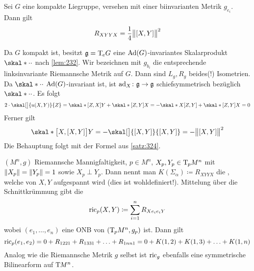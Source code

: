 \begin{korollar}[{name=[Krümmungstensor einer kompakten Liegruppe]}]
	Sei $G$ eine kompakte Liegruppe, versehen mit einer biinvarianten Metrik $g_{e_i}$.
	Dann gilt
	\[
		R_{XYYX} = \frac{1}{4} \norm[\big]{\benbrace*{X,Y}}^2 
	\]
\end{korollar}
\begin{beweis}
	Da $G$ kompakt ist, besitzt $\mathfrak{g} = \Tmap_e G$ eine $\Ad(G)$-invariantes Skalarprodukt $\skal*{\cdot }{\cdot }$ nach \autoref{lem:232}.
	Wir bezeichnen mit $g_{b_i}$ die entsprechende linksinvariante Riemannsche Metrik auf $G$.
	Dann sind $L_g,R_g$ beides(!) Isometrien.
	Da $\skal*{\cdot}{\cdot }$ $\Ad(G)$-invariant ist, ist $\ad_X \colon \mathfrak{g} \to \mathfrak{g}$ schiefsymmetrisch bezüglich $\skal*{\cdot}{\cdot}$.
	Es folgt 
	\[
		2 \cdot \skal[\big]{u(X,Y)}{Z} = \skal*{ \benbrace*{Z,X}}{Y} + \skal*{\benbrace*{Z,Y}}{X} = -\skal*{X}{\benbrace*{Z,Y}} + \skal*{\benbrace*{Z,Y}}{X} =0
	\]
	Ferner gilt 
	\[
		\skal*{\benbrace[\big]{X,\benbrace*{X,Y}}}{Y} = - \skal[\big]{\benbrace*{X,Y}}{\benbrace*{X,Y}} = - \norm[\big]{\benbrace*{X,Y}}^2
	\]
	Die Behauptung folgt mit der Formel aus \autoref{satz:324}.
\end{beweis}

\begin{erinnerung}[{name=[Schnittkrümmung und Ricci-Krümmung]}]
	$(M^n,g)$ Riemannsche Mannigfaltigkeit, $p \in M^n$, $X_p,Y_p \in \Tmap_p M^n$ mit $\norm*{X_p} = \norm*{Y_p} = 1$ sowie $X_p \perp Y_p$.
	Dann nennt man $K(\Sigma_\alpha) \coloneqq R_{XYYX}$ die , welche von $X,Y$ aufgespannt wird (dies ist wohldefiniert!).
	Mittelung über die Schnittkrümmung gibt die 
	\[
		\ric_p(X,Y) \coloneqq \sum_{i=1}^{n} R_{Xe_i e_i Y}
	\]
	wobei $(e_1, \ldots ,e_n)$ eine ONB von $\enbrace*{\Tmap_p M^n,g_p}$ ist.
	Dann gilt
	\[
		\ric_p(e_1,e_2) = 0 + R_{1221} + R_{1331} + \ldots + R_{1nn1} = 0 + K(1,2) + K(1,3) + \ldots + K(1,n)
	\]
	Analog wie die Riemannsche Metrik $g$ selbst ist $\ric_g$ ebenfalls eine symmetrische Bilinearform auf $\Tmap M^n$.
\end{erinnerung}


